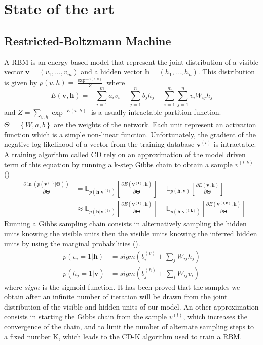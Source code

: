 \documentclass{article} %
\begin{document}
\section{State of the art}
\subsection{Restricted-Boltzmann Machine}
A \gls{RBM} \cite{Hinton:2006:FLA:1161603.1161605} is an energy-based model that represent the joint distribution of a visible vector $\textbf{v} = (v_{1},...,v_{m})$ and a hidden vector $\textbf{h} = (h_{1},...,h_{n})$. This distribution is given by $p(v,h) = \frac{\exp^{-E(v,h)}}{Z}$ where
\begin{equation}
E(\textbf{v},\textbf{h}) = - \sum_{i=1}^{m} a_{i} v_{i} - \sum_{j = 1}^{n} b_{j} h_{j} - \sum_{i=1}^{m} \sum_{j=1}^{n} v_{i} W_{ij} h_{j}
\end{equation}
and $Z = \sum_{v,h}\exp^{-E(v,h)}$ is a usually intractable partition function. $\Theta = \left\lbrace W , a , b \right\rbrace$ are the weights of the network.
Each unit represent an activation function which is a simple non-linear function. Unfortunately, the gradient of the negative log-likelihood of a vector from the training database $\textbf{v}^{(l)}$ is intractable. A training algorithm called \gls{CD} \cite{hinton2002training} rely on an approximation of the model driven term of this equation by running a k-step Gibbs chain to obtain a sample $v^{(l,k)}$ ()
\begin{align}
\label{eq:log-lik-grad}
- \frac{\partial \ln(p(\bm{v^{(l)}}|\bm{\Theta}))}{\partial \bm{\Theta}}  &=  \mathbb{E}_{p(\textbf{h}|\bm{v^{(l)}})} \left[ \frac{\partial E(\bm{v^{(l)}},\textbf{h})}{\partial \bm{\Theta}} \right] - \mathbb{E}_{p(\textbf{h},\textbf{v})} \left[ \frac{\partial E(\textbf{v},\textbf{h})}{\partial \bm{\Theta}} \right]\\
& \approx \mathbb{E}_{p(\textbf{h}|\bm{v^{(l)}})} \left[ \frac{\partial E(\bm{v^{(l)}},\textbf{h})}{\partial \bm{\Theta}} \right] - \mathbb{E}_{p(\textbf{h} | \bm{v^{(l,k)}})} \left[ \frac{\partial E(\bm{v^{(l,k)}},\textbf{h})}{\partial \bm{\Theta}} \right]
\end{align}
Running a Gibbs sampling chain consists in alternatively sampling the hidden units knowing the visible units then the visible units knowing the inferred hidden units by using the marginal probabilities ().
\begin{align}
\label{eq:marginal_RBM}
p(v_{i}=1|\textbf{h}) &= sigm \left( b_{i}^{(v)} + \sum_{j}W_{ij}h_{j} \right)\\
p(h_{j}=1|\textbf{v}) &= sigm \left( b_{j}^{(h)} + \sum_{i}W_{ij}v_{i} \right)
\end{align}
where $sigm$ is the sigmoid function.
It has been proved that the samples we obtain after an infinite number of iteration will be drawn from the joint distribution of the visible and hidden units of our model. An other approximation consists in starting the Gibbs chain from the sample $v^{(l)}$, which increases the convergence of the chain, and to limit the number of alternate sampling steps to a fixed number K, which leads to the CD-K algorithm used to train a \gls{RBM}.
\end{document}
